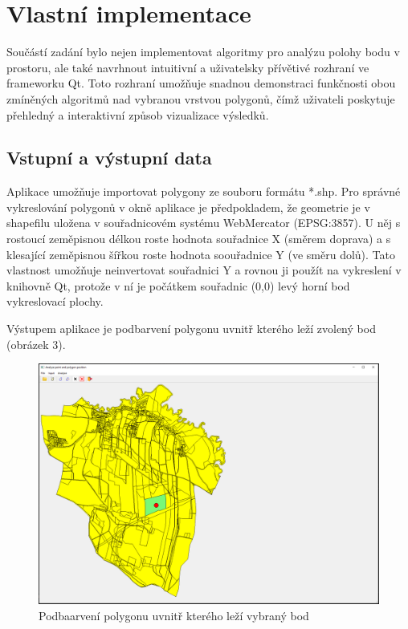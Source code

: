 \documentclass[a4paper,12pt]{article}
\begin{document}
\section{Vlastní implementace}
Součástí zadání bylo nejen implementovat algoritmy pro analýzu polohy bodu v prostoru, ale také navrhnout intuitivní a uživatelsky přívětivé rozhraní ve frameworku Qt. Toto rozhraní umožňuje snadnou demonstraci funkčnosti obou zmíněných algoritmů nad vybranou vrstvou polygonů, čímž uživateli poskytuje přehledný a interaktivní způsob vizualizace výsledků.

\subsection{Vstupní a výstupní data}
Aplikace umožňuje importovat polygony ze souboru formátu *.shp. Pro správné vykreslování polygonů v okně aplikace je předpokladem, že geometrie je v shapefilu uložena v souřadnicovém systému WebMercator (EPSG:3857). U něj s rostoucí zeměpisnou délkou roste hodnota souřadnice X (směrem doprava) a s klesající zeměpisnou šířkou roste hodnota soouřadnice Y (ve směru dolů). Tato vlastnost umožňuje neinvertovat souřadnici Y a rovnou ji použít na vykreslení v knihovně Qt, protože v ní je počátkem souřadnic (0,0) levý horní bod vykreslovací plochy.

Výstupem aplikace je podbarvení polygonu uvnitř kterého leží zvolený bod (obrázek 3).

\begin{figure}[H]
    \centering
    \includegraphics[width=1\linewidth]{app1.png}
    \caption{Podbaarvení polygonu uvnitř kterého leží vybraný bod}
    \label{fig:winding_number}
\end{figure}
\end{document}
